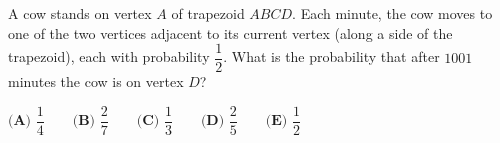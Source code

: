 A cow stands on vertex $A$ of trapezoid $ABCD$. Each minute, the cow moves to one of the two vertices adjacent to its current vertex (along a side of the trapezoid), each with probability $\dfrac12$. What is the probability that after $1001$ minutes the cow is on vertex $D$?

$\textbf{(A) }\dfrac14\qquad\textbf{(B) }\dfrac27\qquad\textbf{(C) }\dfrac13\qquad\textbf{(D) }\dfrac25\qquad\textbf{(E) }\dfrac12$
